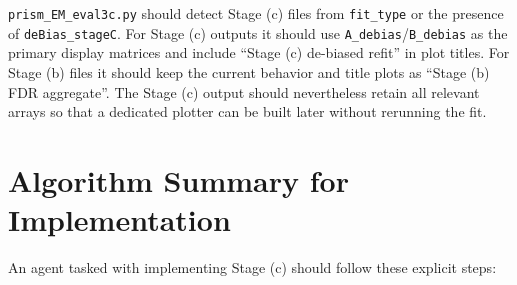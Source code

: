 \documentclass[11pt]{article}
\begin{document}
\texttt{prism\_EM\_eval3c.py} should detect Stage (c) files from
\texttt{fit\_type} or the presence of \texttt{deBias\_stageC}. For Stage (c)
outputs it should use \texttt{A\_debias}/\texttt{B\_debias} as the primary
display matrices and include ``Stage (c) de-biased refit'' in plot titles.
For Stage (b) files it should keep the current behavior and title plots as
``Stage (b) FDR aggregate''. The Stage (c) output should nevertheless retain
all relevant arrays so that a dedicated plotter can be built later without
rerunning the fit.

\section{Algorithm Summary for Implementation}

An agent tasked with implementing Stage (c) should follow these explicit steps:
\end{document}
